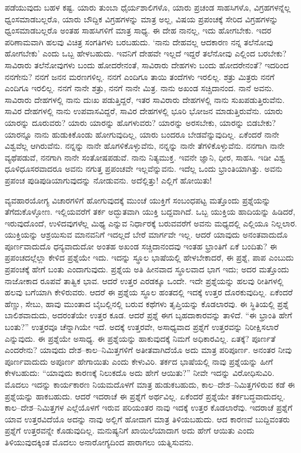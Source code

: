 ಪಡೆಯುವುದು ಬಹಳ ಕಷ್ಟ. ಯಾರು ತುಂಬಾ ಧೈರ್ಯಶಾಲಿಗಳೊ, ಯಾರು ಪ್ರಚಂಡ ಸಾಹಸಿಗಳೊ, ವಿಗ್ರಹಗಳನ್ನೆಲ್ಲ ಧ್ವಂಸಮಾಡಬಲ್ಲರೊ, ಯಾರು ಬೌದ್ದಿಕ ವಿಗ್ರಹಗಳನ್ನು ಮಾತ್ರ ಅಲ್ಲ, ವಿಷಯ ಪ್ರಪಂಚಕ್ಕೆ ಸೇರಿದ ವಿಗ್ರಹಗಳನ್ನು ಧ್ವಂಸಮಾಡಬಲ್ಲರೊ ಅಂತಹ ಸಾಹಸಿಗಳಿಗೆ ಮಾತ್ರ ಸಾಧ್ಯ. ಈ ದೇಹ ನಾನಲ್ಲ, ಇದು ಹೋಗಬೇಕು. ಇದರ ಪರಿಣಾಮವಾಗಿ ಹಲವು ವಿಚಿತ್ರ ಸಂಗತಿಗಳು ಬರಬಹುದು. `ನಾನು ದೇಹವಲ್ಲ ಆದಕಾರಣ ನನ್ನ ತಲೆನೋವು ಹೋಗಬೇಕು' ಎಂದು ಒಬ್ಬ ಹೇಳಬಹುದು. ಇವನಿಗೆ ದೇಹವೇ ಇಲ್ಲದೆ ಇದ್ದರೆ ತಲೆನೋವು ಎಲ್ಲಿಂದ ಬರಬೇಕು? ಸಾವಿರಾರು ತಲೆನೋವುಗಳು ಬಂದು ಹೋದರೇನಂತೆ, ಸಾವಿರಾರು ದೇಹಗಳು ಬಂದು ಹೋದರೇನಂತೆ? ಇದರಿಂದ ನನಗೇನು? ನನಗೆ ಜನನ ಮರಣಗಳಿಲ್ಲ. ನನಗೆ ಎಂದಿಗೂ ತಾಯಿ ತಂದೆಗಳು ಇರಲಿಲ್ಲ. ಶತ್ರು ಮಿತ್ರರು ನನಗೆ ಎಂದಿಗೂ ಇರಲಿಲ್ಲ. ನನಗೆ ನಾನೇ ಶತ್ರು, ನನಗೆ ನಾನೇ ಮಿತ್ರ. ನಾನು ಅಖಂಡ ಸಚ್ಚಿದಾನಂದ. ನಾನೆ ಅವನು. ಸಾವಿರಾರು ದೇಹಗಳಲ್ಲಿ ನಾನು ದುಃಖ ಪಡುತ್ತಿದ್ದರೆ, ಇತರ ಸಾವಿರಾರು ದೇಹಗಳಲ್ಲಿ ನಾನು ಸುಖಪಡುತ್ತಿರುವೆನು. ಸಾವಿರ ದೇಹಗಳಲ್ಲಿ ನಾನು ಉಪವಾಸವಿದ್ದರೆ, ಸಾವಿರ ದೇಹಗಳಲ್ಲಿ ಭೂರಿ ಭೋಜನ ಮಾಡುತ್ತಿರುವೆನು. ಯಾರು ಯಾರನ್ನು ದೂರುವರು? ಯಾರು ಯಾರನ್ನು ಹೊಗಳುವರು? ಯಾರನ್ನು ಅರಸಬೇಕು, ಯಾರನ್ನು ಬಿಡಬೇಕು? ಯಾರನ್ನೂ ನಾನು ಹುಡುಕಿಕೊಂಡು ಹೋಗುವುದಿಲ್ಲ, ಯಾರು ಬಂದರೂ ಬೇಡವೆನ್ನುವುದಿಲ್ಲ. ಏಕೆಂದರೆ ನಾನೇ ವಿಶ್ವವೆಲ್ಲ ಆಗಿರುವೆನು. ನನ್ನನ್ನು ನಾನೇ ಹೊಗಳಿಕೊಳ್ಳುವೆನು, ನನ್ನನ್ನು ನಾನೇ ತೆಗಳಿಕೊಳ್ಳುವೆನು. ನನಗಾಗಿ ನಾನೇ ವ್ಯಥೆಪಡುವೆ, ನನಗಾಗಿ ನಾನೇ ಸಂತೋಷಪಡುವೆ. ನಾನು ನಿತ್ಯಮುಕ್ತ. ಇವನೇ ಜ್ಞಾನಿ, ಧೀರ, ಸಾಹಸಿ. ಇಡೀ ವಿಶ್ವ ಧೂಳಿಧೂಸರವಾದರೂ ಅವನು ನಗುತ್ತ ಪ್ರಪಂಚವೇ ಇಲ್ಲವೆನ್ನುವನು. ಇದೆಲ್ಲ ಒಂದು ಭ್ರಾಂತಿಯಾಗಿತ್ತು. ಅವನು ಪ್ರಪಂಚ ಪುಡಿಪುಡಿಯಾಗುವುದನ್ನು ನೋಡುವನು. ಅದೆಲ್ಲಿತ್ತು! ಎಲ್ಲಿಗೆ ಹೋಯಿತು!

ವ್ಯವಹಾರಯೋಗ್ಯ ವಿಚಾರಗಳಿಗೆ ಹೋಗುವುದಕ್ಕೆ ಮುಂಚೆ ಯುಕ್ತಿಗೆ ಸಂಬಂಧಪಟ್ಟ ಮತ್ತೊಂದು ಪ್ರಶ್ನೆಯನ್ನು ತೆಗೆದುಕೊಳ್ಳೋಣ. ಇಲ್ಲಿಯವರೆಗೆ ತರ್ಕ ಅದ್ಭುತವಾಗಿ ಯುಕ್ತಿ ಬದ್ದವಾಗಿದೆ. ಒಬ್ಬ ಯುಕ್ತಿಯ ಹಾದಿಯನ್ನು ಹಿಡಿದರೆ, ಇರುವುದೊಂದೆ, ಉಳಿದವುಗಳೆಲ್ಲ ಮಿಥ್ಯ ಎನ್ನುವ ನಿರ್ಧಾರಕ್ಕೆ ಬರುವವರೆಗೆ ಅವನು ಮಧ್ಯದಲ್ಲಿ ಎಲ್ಲಿಯೂ ನಿಲ್ಲಲಾರ. ಯುಕ್ತಿಯನ್ನು ಆಶ್ರಯಿಸುವ ಮಾನವನಿಗೆ ಇದಲ್ಲದೆ ಬೇರೆ ಮಾರ್ಗವೇ ಇಲ್ಲ. ಆದರೆ ಯಾವುದು ಅನಂತವಾದುದೊ ಪೂರ್ಣವಾದುದೊ ಧನ್ಯವಾದುದೋ ಅಂತಹ ಅಖಂಡ ಸಚ್ಚಿದಾನಂದವು ಇಂತಹ ಭ್ರಾಂತಿಗೆ ಏಕೆ ಬಂದಿತು? ಈ ಪ್ರಪಂಚದಲ್ಲೆಲ್ಲಾ ಕೇಳಿದ ಪ್ರಶ್ನೆಯೇ ಇದು. ಇದನ್ನು ಸ್ಥೂಲ ಭಾಷೆಯಲ್ಲಿ ಹೇಳಬೇಕಾದರೆ, ಈ ಪ್ರಶ್ನೆ, ಪಾಪ ಎಂಬುದು ಪ್ರಪಂಚಕ್ಕೆ ಹೇಗೆ ಬಂತು ಎಂದಾಗುವುದು. ಪ್ರಶ್ನೆಯ ಅತಿ ಹೀನವಾದ ಸ್ಥೂಲವಾದ ಭಾಗ ಇದು; ಅದರ ಮತ್ತೊಂದು ನಾಜೋಕಾದ ರೂಪವೆ ತಾತ್ವಿಕ ಭಾವ. ಆದರೆ ಉತ್ತರ ಎರಡಕ್ಕೂ ಒಂದೇ. ಇದೇ ಪ್ರಶ್ನೆಯನ್ನು ಹಲವು ರೀತಿಗಳಲ್ಲಿ ಹಲವು ಬಗೆಯಾಗಿ ಕೇಳಿರುವರು. ಆದರೆ ಈ ಪ್ರಶ್ನೆಯ ಸ್ಥೂಲ ಹಂತದಲ್ಲಿ ಇದಕ್ಕೆ ಉತ್ತರ ದೊರಕುವುದಿಲ್ಲ. ಏಕೆಂದರೆ ಹೆಣ್ಣು, ಸೇಬು, ಹಾವು ಮುಂತಾದ ಬೈಬಲ್ಲಿನಲ್ಲಿ ಬರುವ ಕಥೆಗಳು ತೃಪ್ತಿಯನ್ನು ಕೊಡಲಾರವು. ಈ ಸ್ಥಿತಿಯಲ್ಲಿ ಪ್ರಶ್ನೆ ಬಾಲಿಶವಾದುದು, ಅದರಂತೆಯೇ ಉತ್ತರ ಕೂಡ. ಆದರೆ ಪ್ರಶ್ನೆ ಈಗ ಬೃಹದಾಕಾರವನ್ನು ತಾಳಿದೆ. “ಈ ಭ್ರಾಂತಿ ಹೇಗೆ ಬಂತು?'' ಉತ್ತರವೂ ಚೆನ್ನಾಗಿಯೇ ಇದೆ. ಅದಕ್ಕೆ ಉತ್ತರವೇ, ಅಸಾಧ್ಯವಾದ ಪ್ರಶ್ನೆಗೆ ಉತ್ತರವನ್ನು ನಿರೀಕ್ಷಿಸಲಾರೆ ಎನ್ನುವುದು. ಈ ಪ್ರಶ್ನೆಯೇ ಅಸಾಧ್ಯ. ಈ ಪ್ರಶ್ನೆಯನ್ನು ಹಾಕುವುದಕ್ಕೆ ನಿಮಗೆ ಅಧಿಕಾರವಿಲ್ಲ. ಏತಕ್ಕೆ? ಪೂರ್ಣತೆ ಎಂದರೇನು? ಯಾವುದು ದೇಶ–ಕಾಲ–ನಿಮಿತ್ತಗಳಿಗೆ ಅತೀತವಾಗಿದೆಯೊ ಅದು ಮಾತ್ರ ಪರಿಪೂರ್ಣ. ಅನಂತರ ನೀವು ಪೂರ್ಣವಾದುದು ಅಪೂರ್ಣ ಹೇಗಾಯಿತು ಎಂದು ಕೇಳುವಿರಿ. ತರ್ಕದ ಭಾಷೆಯಲ್ಲಿ ನಾವು ಪ್ರಶ್ನೆಯನ್ನು ಹೀಗೆ ಕೇಳಬಹುದು: “ಯಾವುದು ಕಾರಣಕ್ಕೆ ನಿಲುಕದೊ ಅದು ಹೇಗೆ ಆಯಿತು?'' ನೀವೇ ಇದನ್ನು ವಿರೋಧಿಸುವಿರಿ. ಮೊದಲು ಇದನ್ನು ಕಾರ್ಯಕಾರಣ ನಿಯಮದೊಳಗೆ ಮಾತ್ರ ಹುಡುಕಬಹುದು, ಕಾಲ–ದೇಶ–ನಿಮಿತ್ತಗಳಿರುವ ಕಡೆ ಈ ಪ್ರಶ್ನೆಯನ್ನು ಹಾಕಬಹುದು. ಆದರೆ ಇದರಾಚೆ ಈ ಪ್ರಶ್ನೆಗೆ ಅರ್ಥವಿಲ್ಲ. ಏಕೆಂದರೆ ಪ್ರಶ್ನೆಯೇ ತರ್ಕಬದ್ಧವಾದುದಲ್ಲ. ಕಾಲ–ದೇಶ–ನಿಮಿತ್ತಗಳ ಎಲ್ಲೆಯೊಳಗೆ ಇರುವ ಪರಿಯಂತರ ನಾವು ಇದಕ್ಕೆ ಉತ್ತರ ಕೊಡಲಾರೆವು. ಇದರಾಚೆ ಪ್ರಶ್ನೆಗೆ ಯಾವ ಉತ್ತರವಿದೆಯೊ ಅದನ್ನು ನಾವು ಅಲ್ಲಿಗೆ ಹೋದಾಗ ಮಾತ್ರ ತಿಳಿಯಬಹುದು. ಆದ ಕಾರಣವೆ ಬುದ್ದಿವಂತರು ಪ್ರಶ್ನೆಗೆ ಉತ್ತರವನ್ನೇ ಕೊಡುವುದಿಲ್ಲ. ಮನುಷ್ಯನಿಗೆ ಖಾಯಿಲೆಯಾದಾಗ ಅದು ಹೇಗೆ ಆಯಿತು ಎಂದು ತಿಳಿಯುವುದಕ್ಕಿಂತ ಮೊದಲು ಅನಾರೋಗ್ಯದಿಂದ ಪಾರಾಗಲು ಯತ್ನಿಸುವನು.

